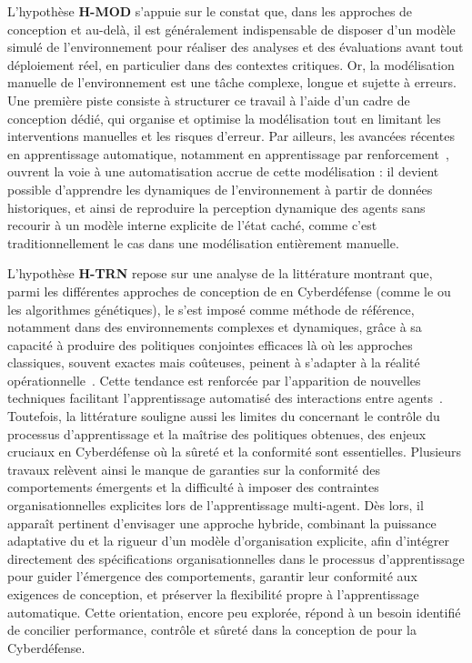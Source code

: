 \noindent L'hypothèse \textbf{H-MOD} s'appuie sur le constat que, dans les approches de conception  et au-delà, il est généralement indispensable de disposer d'un modèle simulé de l'environnement pour réaliser des analyses et des évaluations avant tout déploiement réel, en particulier dans des contextes critiques. Or, la modélisation manuelle de l'environnement est une tâche complexe, longue et sujette à erreurs. Une première piste consiste à structurer ce travail à l'aide d'un cadre de conception dédié, qui organise et optimise la modélisation tout en limitant les interventions manuelles et les risques d'erreur. Par ailleurs, les avancées récentes en apprentissage automatique, notamment en apprentissage par renforcement~\cite{ha2018recurrent}, ouvrent la voie à une automatisation accrue de cette modélisation : il devient possible d'apprendre les dynamiques de l'environnement à partir de données historiques, et ainsi de reproduire la perception dynamique des agents sans recourir à un modèle interne explicite de l'état caché, comme c'est traditionnellement le cas dans une modélisation entièrement manuelle.

\medskip

\noindent L'hypothèse \textbf{H-TRN} repose sur une analyse de la littérature montrant que, parmi les différentes approches de conception de  en Cyberdéfense (comme le  ou les algorithmes génétiques), le  s'est imposé comme méthode de référence, notamment dans des environnements complexes et dynamiques, grâce à sa capacité à produire des politiques conjointes efficaces là où les approches classiques, souvent exactes mais coûteuses, peinent à s'adapter à la réalité opérationnelle~\cite{Zhang2021}. Cette tendance est renforcée par l'apparition de nouvelles techniques facilitant l'apprentissage automatisé des interactions entre agents~\cite{foerster2018communication}. Toutefois, la littérature souligne aussi les limites du  concernant le contrôle du processus d'apprentissage et la maîtrise des politiques obtenues, des enjeux cruciaux en Cyberdéfense où la sûreté et la conformité sont essentielles. Plusieurs travaux relèvent ainsi le manque de garanties sur la conformité des comportements émergents et la difficulté à imposer des contraintes organisationnelles explicites lors de l'apprentissage multi-agent. Dès lors, il apparaît pertinent d'envisager une approche hybride, combinant la puissance adaptative du  et la rigueur d'un modèle d'organisation explicite, afin d'intégrer directement des spécifications organisationnelles dans le processus d'apprentissage pour guider l'émergence des comportements, garantir leur conformité aux exigences de conception, et préserver la flexibilité propre à l'apprentissage automatique. Cette orientation, encore peu explorée, répond à un besoin identifié de concilier performance, contrôle et sûreté dans la conception de  pour la Cyberdéfense.

